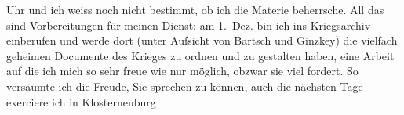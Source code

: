                Uhr und ich weiss noch nicht bestimmt, ob ich die Materie beherrsche. All das sind
               Vorbereitungen für meinen Dienst: am 1. Dez.{ }{\pb}bin ich ins Kriegsarchiv einberufen und werde dort (unter Aufsicht von
                  Bartsch und Ginzkey) die vielfach geheimen Documente des Krieges zu ordnen
               und zu gestalten haben, eine Arbeit auf die ich mich so sehr freue wie nur möglich,
               obzwar sie viel fordert. So versäumte ich die Freude, Sie sprechen zu können, auch
               die nächsten Tage exerciere ich in Klosterneuburg
